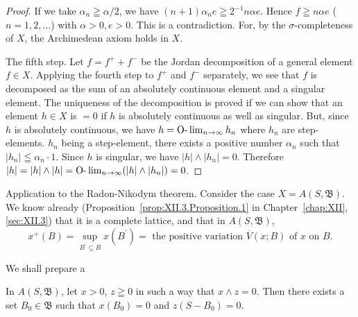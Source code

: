 \begin{proof}
If we take $\alpha_{n} \geqq \alpha / 2$, we have $(n + 1)\alpha_{n}e \geqq 2^{-1}n\alpha e$. Hence $f \geqq n\alpha e$ ( $n = 1, 2, \ldots$) with $\alpha > 0, e > 0$. This is a contradiction. For, by the $\sigma$-completeness of $X$, the Archimedean axiom holds in $X$. 

The fifth step. Let $f = f^{+} + f^{-}$ be the Jordan decomposition of a general element $f \in X$. Applying the fourth step to $f^{+}$ and $f^{-}$ separately, we see that $f$ is decomposed as the sum of an absolutely continuous element and a singular element. The uniqueness of the decomposition is proved if we can show that an element $h \in X$ is $= 0$ if $h$ is absolutely continuous as well as singular. But, since $h$ is absolutely continuous, we have $h = \text{O-}\lim_{n \to \infty} h_{n}$ where $h_{n}$ are step-elements. $h_{n}$ being a step-element, there exists a positive number $\alpha_{n}$ such that $|h_{n}| \leqq \alpha_{n} \cdot 1$. Since $h$ is singular, we have $|h| \wedge |h_{n}| = 0$. Therefore $|h| = |h| \wedge |h| = \text{O-}\lim_{n \to \infty} (|h| \wedge |h_{n}|) = 0$. 
\end{proof}

Application to the Radon-Nikodym theorem. Consider the case $X = A(S, \mathfrak{B})$. We know already (Proposition~\ref{prop:XII.3.Proposition.1} in Chapter~\ref{chap:XII}, \ref{sec:XII.3}) that it is a complete lattice, and that in $A(S, \mathfrak{B})$, 
\begin{equation}\label{eq:XII.6.2}
x^{+}(B) = \sup\limits_{B^{\prime}\subseteq B}x(B^{\prime}) = \text{ the positive variation } \overline{V} (x;B) \text{ of } x \text{ on } B.
\end{equation}

We shall prepare a 


\begin{propositionu} In $A(S, \mathfrak{B})$, let $x > 0$, $z \geqq 0$ in such a way that $x \wedge z = 0$. Then there exists a set $B_0 \in \mathfrak{B}$ such that $x(B_0) = 0$ and $z(S - B_0) = 0$. 
\end{propositionu}



